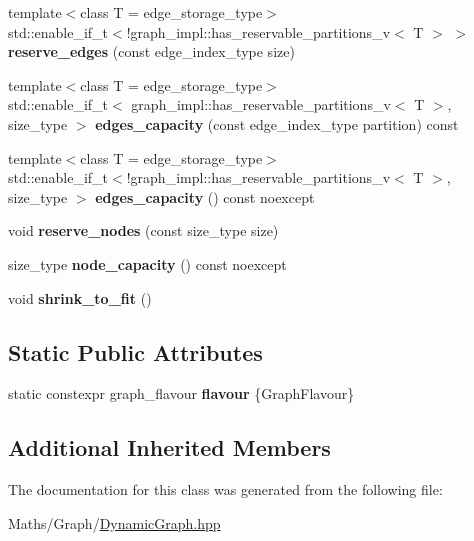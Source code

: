 \begin{DoxyCompactItemize}
\mbox{\label{classsequoia_1_1maths_1_1graph__base_ac713215b452a0e767efee7ecfbe2d8e3}} 
{\footnotesize template$<$class T  = edge\+\_\+storage\+\_\+type$>$ }\\std\+::enable\+\_\+if\+\_\+t$<$!graph\+\_\+impl\+::has\+\_\+reservable\+\_\+partitions\+\_\+v$<$ T $>$ $>$ {\bfseries reserve\+\_\+edges} (const edge\+\_\+index\+\_\+type size)
\item 
\mbox{\label{classsequoia_1_1maths_1_1graph__base_aef265e2f84338de576bff365dfe52e87}} 
{\footnotesize template$<$class T  = edge\+\_\+storage\+\_\+type$>$ }\\std\+::enable\+\_\+if\+\_\+t$<$ graph\+\_\+impl\+::has\+\_\+reservable\+\_\+partitions\+\_\+v$<$ T $>$, size\+\_\+type $>$ {\bfseries edges\+\_\+capacity} (const edge\+\_\+index\+\_\+type partition) const
\item 
\mbox{\label{classsequoia_1_1maths_1_1graph__base_a5fa56ed62b7c45a8a67837c7349e64ca}} 
{\footnotesize template$<$class T  = edge\+\_\+storage\+\_\+type$>$ }\\std\+::enable\+\_\+if\+\_\+t$<$!graph\+\_\+impl\+::has\+\_\+reservable\+\_\+partitions\+\_\+v$<$ T $>$, size\+\_\+type $>$ {\bfseries edges\+\_\+capacity} () const noexcept
\item 
\mbox{\label{classsequoia_1_1maths_1_1graph__base_afedce51c52c53b2b01fd9a69b04f885e}} 
void {\bfseries reserve\+\_\+nodes} (const size\+\_\+type size)
\item 
\mbox{\label{classsequoia_1_1maths_1_1graph__base_ac2941b24817886d4b7b876c4c7424437}} 
size\+\_\+type {\bfseries node\+\_\+capacity} () const noexcept
\item 
\mbox{\label{classsequoia_1_1maths_1_1graph__base_a162a0acf42cf4dde704be83266266157}} 
void {\bfseries shrink\+\_\+to\+\_\+fit} ()
\end{DoxyCompactItemize}
\subsection*{Static Public Attributes}
\begin{DoxyCompactItemize}
\item 
\mbox{\label{classsequoia_1_1maths_1_1graph__base_ab3cf38720a647f8a4d97942c4735cc3a}} 
static constexpr graph\+\_\+flavour {\bfseries flavour} \{Graph\+Flavour\}
\end{DoxyCompactItemize}
\subsection*{Additional Inherited Members}


The documentation for this class was generated from the following file\+:\begin{DoxyCompactItemize}
\item 
Maths/\+Graph/\mbox{\hyperlink{_dynamic_graph_8hpp}{Dynamic\+Graph.\+hpp}}\end{DoxyCompactItemize}
